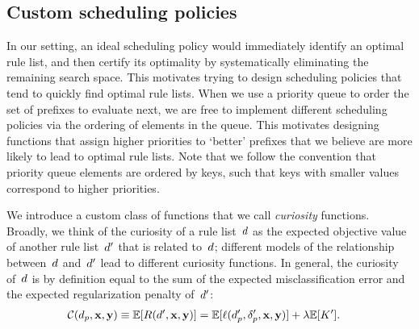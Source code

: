\subsection{Custom scheduling policies}
\label{sec:scheduling}

In our setting, an ideal scheduling policy would immediately identify an optimal
rule list, and then certify its optimality by systematically eliminating the
remaining search space.
%
This motivates trying to design scheduling policies that tend to quickly find optimal rule lists.
%
When we use a priority queue to order the set of prefixes to evaluate next,
we are free to implement different scheduling policies via the ordering of
elements in the queue.
%
This motivates designing functions that assign higher priorities to `better'
prefixes that we believe are more likely to lead to optimal rule lists.
%
Note that we follow the convention that priority queue elements are ordered
by keys, such that keys with smaller values correspond to higher priorities.

We introduce a custom class of functions that we call \emph{curiosity} functions.
%
Broadly, we think of the curiosity of a rule list~${d}$
as the expected objective value of another rule list~${d}'$ that is related to~${d}$;
different models of the relationship between~${d}$ and~${d}'$ lead to different
curiosity functions.
%
In general, the curiosity of~${d}$ is by definition equal to the sum of the expected
misclassification error and the expected regularization penalty of~${d}'$:
\begin{align}
\mathcal{C}(d_p, \mathbf{x}, \mathbf{y}) \equiv \mathbb{E}[ R({d}', \mathbf{x}, \mathbf{y}) ]
&= \mathbb{E}[\ell(d_p', \delta_p', \mathbf{x}, \mathbf{y})] + {\lambda} \mathbb{E}[ K' ].
\label{eq:curiosity}
\end{align}

